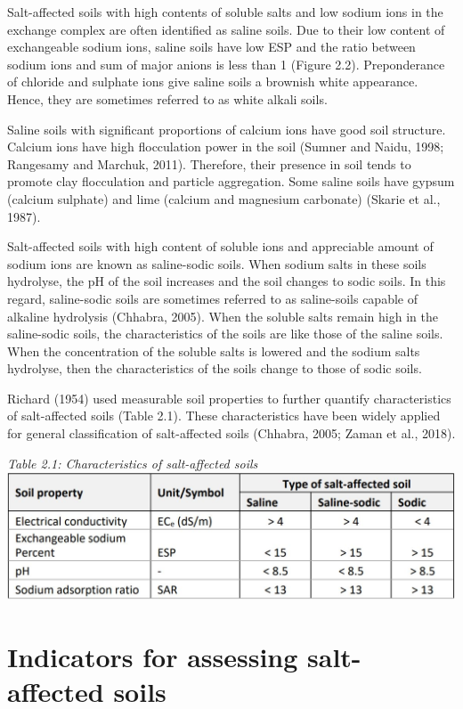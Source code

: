 \documentclass[
  10pt,
  b5paper,
]{book}
\begin{document}
Salt-affected soils with high contents of soluble salts and low sodium ions in the exchange complex are often identified as saline soils. Due to their low content of exchangeable sodium ions, saline soils have low ESP and the ratio between sodium ions and sum of major anions is less than 1 (Figure 2.2). Preponderance of chloride and sulphate ions give saline soils a brownish white appearance. Hence, they are sometimes referred to as white alkali soils.

Saline soils with significant proportions of calcium ions have good soil structure. Calcium ions have high flocculation power in the soil (Sumner and Naidu, 1998; Rangesamy and Marchuk, 2011). Therefore, their presence in soil tends to promote clay flocculation and particle aggregation. Some saline soils have gypsum (calcium sulphate) and lime (calcium and magnesium carbonate) (Skarie et al., 1987).

Salt-affected soils with high content of soluble ions and appreciable amount of sodium ions are known as saline-sodic soils. When sodium salts in these soils hydrolyse, the pH of the soil increases and the soil changes to sodic soils. In this regard, saline-sodic soils are sometimes referred to as saline-soils capable of alkaline hydrolysis (Chhabra, 2005). When the soluble salts remain high in the saline-sodic soils, the characteristics of the soils are like those of the saline soils. When the concentration of the soluble salts is lowered and the sodium salts hydrolyse, then the characteristics of the soils change to those of sodic soils.

Richard (1954) used measurable soil properties to further quantify characteristics of salt-affected soils (Table 2.1). These characteristics have been widely applied for general classification of salt-affected soils (Chhabra, 2005; Zaman et al., 2018).

\emph{Table 2.1: Characteristics of salt-affected soils}\\
\includegraphics{figures/tables/Table_2.1.jpg}

\hypertarget{indicators-for-assessing-salt-affected-soils}{%
\section{Indicators for assessing salt-affected soils}\label{indicators-for-assessing-salt-affected-soils}}
\end{document}
